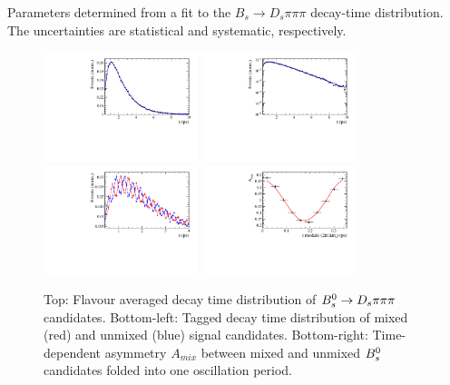 \begin{table}[h]
\centering
\footnotesize
\caption{\small Parameters determined from a fit to the $B_s \to D_s \pi \pi\pi$ decay-time distribution. The uncertainties are statistical and systematic, respectively.}
	\renewcommand{\arraystretch}{1.25}
	
\label{tab:normFitResults}
\end{table}

\begin{figure}[h]
	\centering
		\includegraphics[width=0.4\textwidth, height = !]{figs/timeFit/norm_taggingCalib/h_t.pdf} 
		\includegraphics[width=0.4\textwidth, height = !]{figs/timeFit/norm_taggingCalib/h_t_log.pdf} 
		\includegraphics[width=0.4\textwidth, height = !]{figs/timeFit/norm_taggingCalib/h_t_mixed.pdf} 
		\includegraphics[width=0.4\textwidth, height = !]{figs/timeFit/norm_taggingCalib/h_asym.pdf} 		
		\caption{
		\footnotesize Top: Flavour averaged decay time distribution of ${{B}^0_{s}}\rightarrow{\ensuremath{{D}_{s}}}{\ensuremath{\pi}}{\ensuremath{\pi}}{\ensuremath{\pi}}$ candidates. 
Bottom-left: Tagged decay time distribution of mixed (red) and unmixed (blue) signal candidates. 
Bottom-right: Time-dependent asymmetry $A_{mix}$ between mixed and unmixed ${{B}^0_{s}}$ candidates folded into one oscillation period.} 		
		\label{fig:tFitNorm}
\end{figure}	

